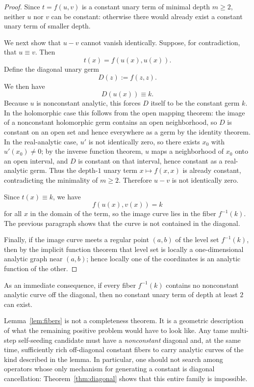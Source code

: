 \documentclass[12pt]{amsart}
\theoremstyle{remark}
\begin{document}
\begin{proof}
Since $t=f(u,v)$ is a constant unary term of minimal depth $m\geq 2$, neither $u$ nor $v$ can be constant: otherwise there would already exist a constant unary term of smaller depth.

We next show that $u-v$ cannot vanish identically.  Suppose, for contradiction, that $u\equiv v$.  Then
\[
t(x)=f(u(x),u(x)).
\]
Define the diagonal unary germ
\[
D(z):=f(z,z).
\]
We then have
\[
D(u(x))\equiv k.
\]
Because $u$ is nonconstant analytic, this forces $D$ itself to be the constant germ $k$.  In the holomorphic case this follows from the open mapping theorem: the image of a nonconstant holomorphic germ contains an open neighborhood, so $D$ is constant on an open set and hence everywhere as a germ by the identity theorem.  In the real-analytic case, $u'$ is not identically zero, so there exists $x_0$ with $u'(x_0)\neq 0$; by the inverse function theorem, $u$ maps a neighborhood of $x_0$ onto an open interval, and $D$ is constant on that interval, hence constant as a real-analytic germ.  Thus the depth-$1$ unary term $x\mapsto f(x,x)$ is already constant, contradicting the minimality of $m\geq 2$.  Therefore $u-v$ is not identically zero.

Since $t(x)\equiv k$, we have
\[
f(u(x),v(x))=k
\]
for all $x$ in the domain of the term, so the image curve lies in the fiber $f^{-1}(k)$.  The previous paragraph shows that the curve is not contained in the diagonal.

Finally, if the image curve meets a regular point $(a,b)$ of the level set $f^{-1}(k)$, then by the implicit function theorem that level set is locally a one-dimensional analytic graph near $(a,b)$; hence locally one of the coordinates is an analytic function of the other.\qedhere
\end{proof}

As an immediate consequence, if every fiber $f^{-1}(k)$ contains no nonconstant analytic curve off the diagonal, then no constant unary term of depth at least $2$ can exist.

Lemma~\ref{lem:fibers} is not a completeness theorem.  It is a geometric description of what the remaining positive problem would have to look like.  Any tame multi-step self-seeding candidate must have a \emph{nonconstant} diagonal and, at the same time, sufficiently rich off-diagonal constant fibers to carry analytic curves of the kind described in the lemma.  In particular, one should not search among operators whose only mechanism for generating a constant is diagonal cancellation: Theorem~\ref{thm:diagonal} shows that this entire family is impossible.
\end{document}
